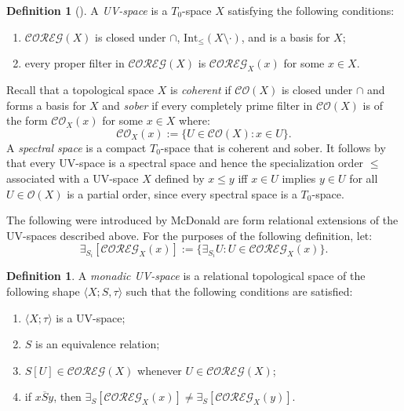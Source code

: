 \documentclass[reqno]{amsart}
\theoremstyle{plain}
\theoremstyle{definition}
\newtheorem{definition}[theorem]{Definition}
\begin{document}
\begin{definition}[\cite{bez}]\label{uv space}
    A \emph{UV-space} is a $T_0$-space $X$ satisfying the following conditions: 
    \begin{enumerate}
        \item $\mathcal{COREG}(X)$ is closed under $\cap$, $\text{Int}_{\leqslant}(X\setminus\cdot)$, and is a basis for $X$; 
        \item every proper filter in $\mathcal{COREG}(X)$ is $\mathcal{COREG}_X(x)$ for some $x\in X$. 
    \end{enumerate}
\end{definition}
Recall that a topological space $X$ is \emph{coherent} if $\mathcal{CO}(X)$ is closed under $\cap$ and forms a basis for $X$ and \emph{sober} if every completely prime filter in $\mathcal{CO}(X)$ is of the form $\mathcal{CO}_X(x)$ for some $x\in X$ where: \[\mathcal{CO}_X(x):=\{U\in\mathcal{CO}(X):x\in U\}.\] A \emph{spectral space} is a compact $T_0$-space that is coherent and sober. It follows by \cite[Corollary 5.5]{bez} that every UV-space is a spectral space and hence the specialization order $\leqslant$ associated with a UV-space $X$ defined by $x\leqslant y$ iff $x\in U$ implies $y\in U$ for all $U\in\mathcal{O}(X)$ is a partial order, since every spectral space is a $T_0$-space.   


The following were introduced by McDonald \cite{mcdonald2} are form relational extensions of the UV-spaces described above. For the purposes of the following definition, let:  
\[\exists_{S_i}[\mathcal{COREG}_X(x)]:=\{\exists_{S_i}U:U\in\mathcal{COREG}_X(x)\}.\]

\begin{definition}
     A \emph{monadic UV-space} is a relational topological space of the following shape $\langle X;S,\tau\rangle$ such that the following conditions are satisfied: 
     \begin{enumerate}
         \item $\langle X;\tau\rangle$ is a UV-space; 
         \item $S$ is an equivalence relation; 
         \item $S[U]\in\mathcal{COREG}(X)$ whenever $U\in\mathcal{COREG}(X)$;
        \item if $x\overline{S}y$, then $\exists_{S}[\mathcal{COREG}_X(x)]\not=\exists_{S}[\mathcal{COREG}_X(y)]$.  
     \end{enumerate}
\end{definition}
\end{document}
